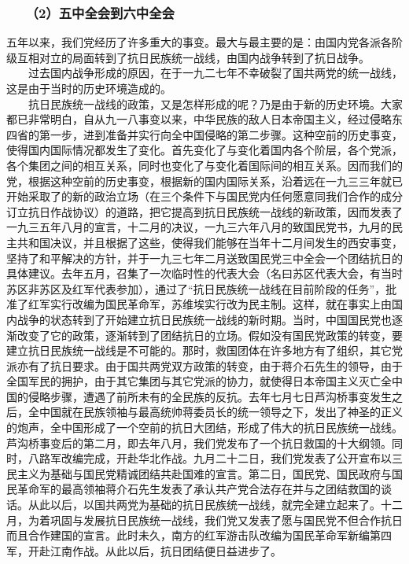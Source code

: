 \documentclass[cn,11pt,chinese]{elegantbook}
\def\myformat#1{\hfil\hfil #1}
\begin{document}
\subsubsection*{\myformat{　　（2）五中全会到六中全会}}
五年以来，我们党经历了许多重大的事变。最大与最主要的是：由国内党各派各阶级互相对立的局面转到了抗日民族统一战线，由国内战争转到了抗日战争。\\
　　过去国内战争形成的原因，在于一九二七年不幸破裂了国共两党的统一战线，这是由于当时的历史环境造成的。\\
　　抗日民族统一战线的政策，又是怎样形成的呢？乃是由于新的历史环境。大家都已非常明白，自从九一八事变以来，中华民族的敌人日本帝国主义，经过侵略东四省的第一步，进到准备并实行向全中国侵略的第二步骤。这种空前的历史事变，使得国内国际情况都发生了变化。首先变化了与变化着国内各个阶层，各个党派，各个集团之间的相互关系，同时也变化了与变化着国际间的相互关系。因而我们的党，根据这种空前的历史事变，根据新的国内国际关系，沿着远在一九三三年就已开始采取了的新的政治立场（在三个条件下与国民党内任何愿意同我们合作的成分订立抗日作战协议）的道路，把它提高到抗日民族统一战线的新政策，因而发表了一九三五年八月的宣言，十二月的决议，一九三六年八月的致国民党书，九月的民主共和国决议，并且根据了这些，使得我们能够在当年十二月间发生的西安事变，坚持了和平解决的方针，并于一九三七年二月送致国民党三中全会一个团结抗日的具体建议。去年五月，召集了一次临时性的代表大会（名曰苏区代表大会，有当时苏区非苏区及红军代表参加），通过了“抗日民族统一战线在目前阶段的任务”，批准了红军实行改编为国民革命军，苏维埃实行改为民主制。这样，就在事实上由国内战争的状态转到了开始建立抗日民族统一战线的新时期。当时，中国国民党也逐渐改变了它的政策，逐渐转到了团结抗日的立场。假如没有国民党政策的转变，要建立抗日民族统一战线是不可能的。那时，救国团体在许多地方有了组织，其它党派亦有了抗日要求。由于国共两党双方政策的转变，由于蒋介石先生的领导，由于全国军民的拥护，由于其它集团与其它党派的协力，就使得日本帝国主义灭亡全中国的侵略步骤，遭遇了前所未有的全民族的反抗。去年七月七日芦沟桥事变发生之后，全中国就在民族领袖与最高统帅蒋委员长的统一领导之下，发出了神圣的正义的炮声，全中国形成了一个空前的抗日大团结，形成了伟大的抗日民族统一战线。芦沟桥事变后的第二月，即去年八月，我们党发布了一个抗日救国的十大纲领。同时，八路军改编完成，开赴华北作战。九月二十二日，我们党发表了公开宣布以三民主义为基础与国民党精诚团结共赴国难的宣言。第二日，国民党、国民政府与国民革命军的最高领袖蒋介石先生发表了承认共产党合法存在并与之团结救国的谈话。从此以后，以国共两党为基础的抗日民族统一战线，就完全建立起来了。十二月，为着巩固与发展抗日民族统一战线，我们党又发表了愿与国民党不但合作抗日而且合作建国的宣言。此时未久，南方的红军游击队改编为国民革命军新编第四军，开赴江南作战。从此以后，抗日团结便日益进步了。\\
\end{document}
